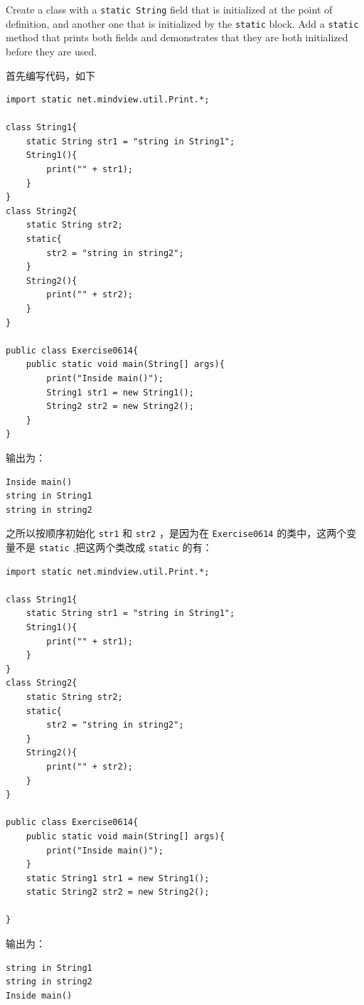 \documentclass[10pt,a4paper,UTF8]{article}
\begin{document}
\begin{problem}
Create a class with a \texttt{static String} field that is initialized at the point of definition, and another one that is initialized by the \texttt{static} block. Add a \texttt{static} method that prints both fields and demonstrates that they are both initialized before they are used.
\end{problem}
\begin{answer}
首先编写代码，如下

\lstset{language=C,label= ,caption= ,captionpos=b,firstnumber=1,numbers=left}
\begin{lstlisting}
import static net.mindview.util.Print.*;

class String1{
    static String str1 = "string in String1";
    String1(){
        print("" + str1);
    }
}
class String2{
    static String str2;
    static{
        str2 = "string in string2";
    }
    String2(){
        print("" + str2);
    }
}

public class Exercise0614{
    public static void main(String[] args){
        print("Inside main()");
        String1 str1 = new String1();
        String2 str2 = new String2();
    }
}
\end{lstlisting}
输出为：
\begin{verbatim}
Inside main()
string in String1
string in string2
\end{verbatim}
之所以按顺序初始化 \texttt{str1} 和 \texttt{str2} ，是因为在 \texttt{Exercise0614} 的类中，这两个变量不是 \texttt{static} ,把这两个类改成 \texttt{static} 的有：
\lstset{language=C,label= ,caption= ,captionpos=b,firstnumber=1,numbers=left}
\begin{lstlisting}
import static net.mindview.util.Print.*;

class String1{
    static String str1 = "string in String1";
    String1(){
        print("" + str1);
    }
}
class String2{
    static String str2;
    static{
        str2 = "string in string2";
    }
    String2(){
        print("" + str2);
    }
}

public class Exercise0614{
    public static void main(String[] args){
        print("Inside main()");
    }
    static String1 str1 = new String1();
    static String2 str2 = new String2();

}
\end{lstlisting}
输出为：
\begin{verbatim}
string in String1
string in string2
Inside main()
\end{verbatim}


\end{answer}
\end{document}
